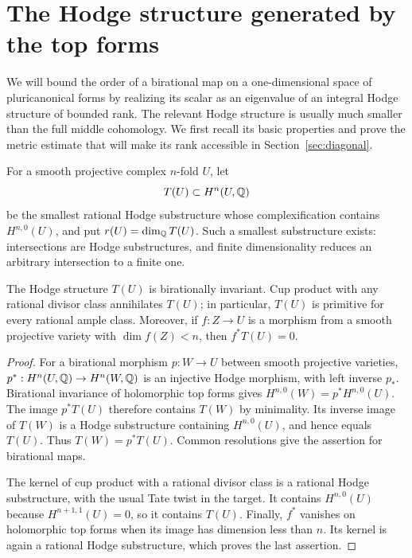 \section{The Hodge structure generated by the top forms}\label{sec:hodge}

We will bound the order of a birational map on a one-dimensional space of
pluricanonical forms by realizing its scalar as an eigenvalue of an integral
Hodge structure of bounded rank.  The relevant Hodge structure is usually
much smaller than the full middle cohomology.  We first recall its basic
properties and prove the metric estimate that will make its rank accessible
in Section~\ref{sec:diagonal}.

For a smooth projective complex $n$-fold $U$, let
\[
 T(U)\subset H^n(U,\mathbb Q)
\]
be the smallest rational Hodge substructure whose complexification contains
$H^{n,0}(U)$, and put $r(U)=\dim_\mathbb Q T(U)$.  Such a smallest substructure
exists: intersections are Hodge substructures, and finite dimensionality
reduces an arbitrary intersection to a finite one.

\begin{lemma}\label{hodge:basic}
The Hodge structure $T(U)$ is birationally invariant.  Cup product with
any rational divisor class annihilates $T(U)$; in particular, $T(U)$ is
primitive for every rational ample class.  Moreover, if $f:Z\to U$ is a
morphism from a smooth projective variety with $\dim f(Z)<n$, then
$f^*T(U)=0$.
\end{lemma}

\begin{proof}
For a birational morphism $p:W\to U$ between smooth projective varieties,
$p^*:H^n(U,\mathbb Q)\to H^n(W,\mathbb Q)$ is an injective Hodge morphism, with left
inverse $p_*$.  Birational invariance of holomorphic top forms gives
$H^{n,0}(W)=p^*H^{n,0}(U)$.  The image $p^*T(U)$ therefore contains
$T(W)$ by minimality.  Its inverse image of $T(W)$ is a Hodge substructure
containing $H^{n,0}(U)$, and hence equals $T(U)$.  Thus
$T(W)=p^*T(U)$.  Common resolutions give the assertion for birational maps.

The kernel of cup product with a rational divisor class is a rational
Hodge substructure, with the usual Tate twist in the target.  It contains
$H^{n,0}(U)$ because $H^{n+1,1}(U)=0$, so it contains $T(U)$.  Finally,
$f^*$ vanishes on holomorphic top forms when its image has dimension less
than $n$.  Its kernel is again a rational Hodge substructure, which proves
the last assertion.
\end{proof}

